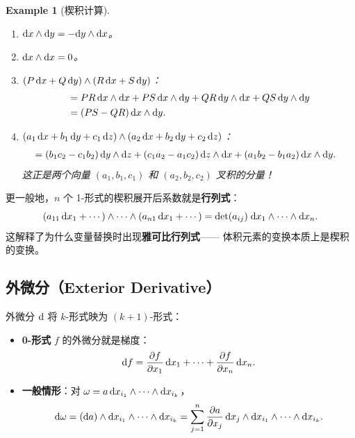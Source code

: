 \documentclass{article}
\newtheorem{example}[theorem]{Example}
\begin{document}
\begin{example}[楔积计算]
  \begin{enumerate}
    \item $\mathrm{d} x \wedge \mathrm{d} y = -\mathrm{d} y \wedge \mathrm{d} x$。
    \item $\mathrm{d} x \wedge \mathrm{d} x = 0$。
    \item $(P\,\mathrm{d} x + Q\,\mathrm{d} y) \wedge (R\,\mathrm{d} x + S\,\mathrm{d} y)$：
      \begin{align*}
        &= PR\,\mathrm{d} x \wedge \mathrm{d} x + PS\,\mathrm{d} x \wedge \mathrm{d} y
        + QR\,\mathrm{d} y \wedge \mathrm{d} x + QS\,\mathrm{d} y \wedge \mathrm{d} y \\
        &= (PS - QR)\,\mathrm{d} x \wedge \mathrm{d} y.
      \end{align*}
    \item $(a_1\,\mathrm{d} x + b_1\,\mathrm{d} y + c_1\,\mathrm{d} z) \wedge
      (a_2\,\mathrm{d} x + b_2\,\mathrm{d} y + c_2\,\mathrm{d} z)$：
      \begin{align*}
        &= (b_1 c_2 - c_1 b_2)\,\mathrm{d} y \wedge \mathrm{d} z
        + (c_1 a_2 - a_1 c_2)\,\mathrm{d} z \wedge \mathrm{d} x
        + (a_1 b_2 - b_1 a_2)\,\mathrm{d} x \wedge \mathrm{d} y.
      \end{align*}
      这正是两个向量 $(a_1,b_1,c_1)$ 和 $(a_2,b_2,c_2)$ 叉积的分量！
  \end{enumerate}
\end{example}

\begin{remark}[楔积与行列式]
  更一般地，$n$ 个 1-形式的楔积展开后系数就是\textbf{行列式}：
  \[
    (a_{11}\,\mathrm{d} x_1 + \cdots) \wedge \cdots \wedge (a_{n1}\,\mathrm{d} x_1 + \cdots)
    = \det(a_{ij}) \;\mathrm{d} x_1 \wedge \cdots \wedge \mathrm{d} x_n.
  \]
  这解释了为什么变量替换时出现\textbf{雅可比行列式}——
  体积元素的变换本质上是楔积的变换。
\end{remark}

\subsection{外微分（Exterior Derivative）}

\begin{definition}[外微分]
  外微分 $\mathrm{d}$ 将 $k$-形式映为 $(k+1)$-形式：
  \begin{itemize}
    \item \textbf{0-形式} $f$ 的外微分就是梯度：
      \[
        \mathrm{d} f = \frac{\partial f}{\partial x_1}\,\mathrm{d} x_1 + \cdots +
        \frac{\partial f}{\partial x_n}\,\mathrm{d} x_n.
      \]
    \item \textbf{一般情形}：对 $\omega = a\,\mathrm{d} x_{i_1} \wedge \cdots
      \wedge \mathrm{d} x_{i_k}$，
      \[
        \mathrm{d}\omega = (\mathrm{d} a) \wedge \mathrm{d} x_{i_1} \wedge \cdots
        \wedge \mathrm{d} x_{i_k}
        = \sum_{j=1}^{n} \frac{\partial a}{\partial x_j}\,\mathrm{d} x_j \wedge \mathrm{d}
        x_{i_1} \wedge \cdots \wedge \mathrm{d} x_{i_k}.
      \]
  \end{itemize}
\end{definition}
\end{document}
